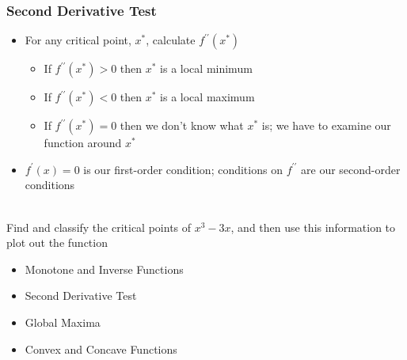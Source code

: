 \documentclass[aspectratio=169]{beamer}
\numberwithin{equation}{section}
\begin{document}
\begin{frame}
\frametitle{Second Derivative Test}

\begin{itemize}
\item For any critical point, $x^*$, calculate $f^{\prime\prime}(x^*)$ \pause

\begin{itemize}
\item If $f^{\prime\prime}(x^*)>0$ then $x^*$ is a local minimum \pause
\item If $f^{\prime\prime}(x^*)<0$ then $x^*$ is a local maximum \pause

\item If $f^{\prime\prime}(x^*)=0$ then we don't know what $x^*$ is; we have to examine our function around $x^*$ \pause

\end{itemize}

\item $f^\prime(x)=0$ is our first-order condition; conditions on $f^{\prime\prime}$ are our second-order conditions \pause

\end{itemize}

\ \\Find and classify the critical points of $x^3-3x$, and then use this information to plot out the function

\end{frame}



\begin{frame}

\begin{itemize}
\item \textcolor{mygray}{Monotone and Inverse Functions}

\item \textcolor{mygray}{Second Derivative Test}
\item \textcolor{myblack}{Global Maxima}
\item \textcolor{mygray}{Convex and Concave Functions}
\end{itemize}

\end{frame}
\end{document}
